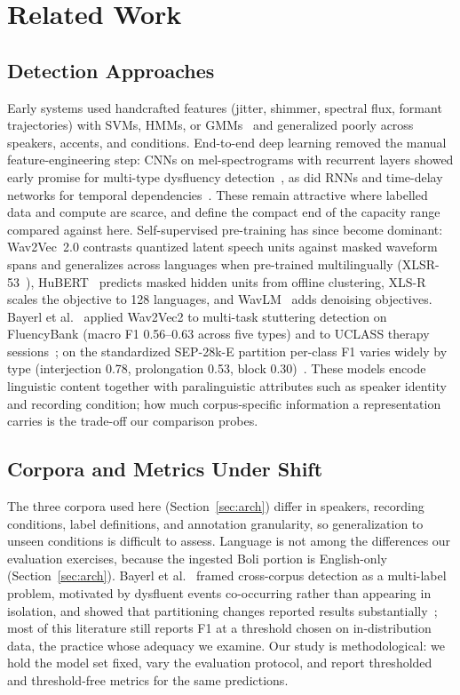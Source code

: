 \documentclass[a4paper,orivec]{llncs}
\begin{document}
\section{Related Work}
\label{sec:related}

\subsection{Detection Approaches}
Early systems used handcrafted features (jitter, shimmer, spectral flux, formant
trajectories) with SVMs, HMMs, or GMMs~\cite{sheikh2022review} and generalized
poorly across speakers, accents, and conditions. End-to-end deep learning removed
the manual feature-engineering step: CNNs on mel-spectrograms with recurrent
layers showed early promise for multi-type dysfluency
detection~\cite{kourkounakis2020detecting}, as did RNNs and time-delay networks
for temporal dependencies~\cite{sheikh2021stutternet}. These remain attractive
where labelled data and compute are scarce, and define the compact end of the
capacity range compared against here. Self-supervised pre-training has since
become dominant: Wav2Vec~2.0 contrasts quantized latent speech units against
masked waveform spans and generalizes across languages when pre-trained
multilingually (XLSR-53~\cite{conneau2021xlsr}), HuBERT~\cite{hsu2021hubert}
predicts masked hidden units from offline clustering, XLS-R~\cite{babu2022xlsr}
scales the objective to 128 languages, and WavLM~\cite{chen2022wavlm} adds
denoising objectives. Bayerl et al.~\cite{bayerl2022multi} applied Wav2Vec2 to
multi-task stuttering detection on FluencyBank (macro F1 0.56--0.63 across five
types) and to UCLASS therapy sessions~\cite{bayerl2022therapy}; on the
standardized SEP-28k-E partition per-class F1 varies widely by type (interjection
0.78, prolongation 0.53, block 0.30)~\cite{susac2026stuttmil}. These models encode
linguistic content together with paralinguistic attributes such as speaker
identity and recording condition; how much corpus-specific information a
representation carries is the trade-off our comparison probes.

\subsection{Corpora and Metrics Under Shift}
The three corpora used here (Section~\ref{sec:arch}) differ in speakers,
recording conditions, label definitions, and annotation granularity, so
generalization to unseen conditions is difficult to assess. Language is not among
the differences our evaluation exercises, because the ingested Boli portion is
English-only (Section~\ref{sec:arch}). Bayerl et
al.~\cite{bayerl2023crosscorpus} framed cross-corpus detection as a multi-label
problem, motivated by dysfluent events co-occurring rather than appearing in
isolation, and showed that partitioning changes reported results
substantially~\cite{bayerl2022partitioning}; most of this literature still reports
F1 at a threshold chosen on in-distribution data, the practice whose adequacy we
examine. Our study is methodological: we hold the model set fixed, vary the
evaluation protocol, and report thresholded and threshold-free metrics for the
same predictions.
\end{document}
